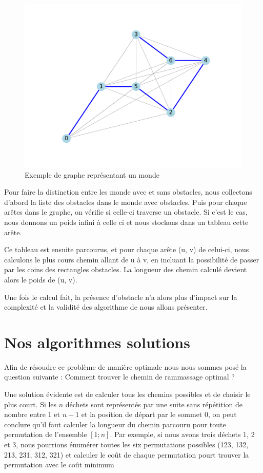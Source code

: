 \documentclass{report}
\begin{document}
\begin{figure}[!h]
    \centerline{\includegraphics[scale=1]{best_path_arbitrary-1.png}}
    \caption{Exemple de graphe repr\'esentant un monde} 
  \end{figure}

Pour faire la distinction entre les monde avec et sans obstacles, nous collectons d'abord la liste des obstacles dans le monde avec obstacles. Puis pour chaque arêtes dans le graphe,
on v\'erifie si celle-ci traverse un obstacle. Si c'est le cas, nous donnons un poids infini à celle ci et nous stockons dans un tableau cette arête.

Ce tableau est ensuite parcourus, et pour chaque arête (u, v) de celui-ci, nous calculons le plus cours chemin allant de u à v, en incluant la possibilité de passer par les coins des rectangles obstacles. La longueur des chemin calculé devient alors le poids de (u, v).

Une fois le calcul fait, la présence d'obstacle n'a alors plus d'impact sur la complexité et la validité des algorithme de nous allons présenter.

\section{Nos algorithmes solutions}

Afin de résoudre ce problème de manière optimale nous nous sommes posé la question suivante : Comment trouver le chemin de rammassage optimal ?

Une solution évidente est de calculer tous les chemins possibles et de choisir le plus court. Si les $n$ déchets sont représentés par une suite sans répétition de nombre entre 1 et $n - 1$ et la position de départ par le sommet 0, on peut conclure qu'il faut calculer la longueur du chemin parcouru pour toute permutation de l'ensemble $[1 ; n]$.
Par exemple, si nous avons trois d\'echets 1, 2 et 3, nous pourrions \'enum\'erer toutes les six permutations possibles (123, 132, 213, 231, 312, 321) et calculer le co\^ut de chaque permutation pourt trouver la permutation avec le co\^ut minimum
\end{document}
